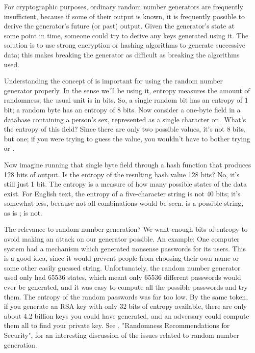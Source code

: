 \documentclass{howto}
\begin{document}
For cryptographic purposes, ordinary random number generators are
frequently insufficient, because if some of their output is known, it
is frequently possible to derive the generator's future (or past)
output.  Given the generator's state at some point in time, someone
could try to derive any keys generated using it.  The solution is to
use strong encryption or hashing algorithms to generate successive
data; this makes breaking the generator as difficult as breaking the
algorithms used.

Understanding the concept of  is important for using the
random number generator properly.  In the sense we'll be using it,
entropy measures the amount of randomness; the usual unit is in bits.
So, a single random bit has an entropy of 1 bit; a random byte has an
entropy of 8 bits.  Now consider a one-byte field in a database containing a
person's sex, represented as a single character  or .
What's the entropy of this field?  Since there are only two possible
values, it's not 8 bits, but one; if you were trying to guess the value,
you wouldn't have to bother trying  or .  

Now imagine running that single byte field through a hash function that
produces 128 bits of output.  Is the entropy of the resulting hash value
128 bits?  No, it's still just 1 bit.  The entropy is a measure of how many
possible states of the data exist.  For English
text, the entropy of a five-character string is not 40 bits; it's
somewhat less, because not all combinations would be seen.  
is a possible string, as is ;  is not.

The relevance to random number generation?  We want enough bits of
entropy to avoid making an attack on our generator possible.  An
example: One computer system had a mechanism which generated nonsense
passwords for its users.  This is a good idea, since it would prevent
people from choosing their own name or some other easily guessed string.
Unfortunately, the random number generator used only had 65536 states,
which meant only 65536 different passwords would ever be generated, and
it was easy to compute all the possible passwords and try them.  The
entropy of the random passwords was far too low.  By the same token, if
you generate an RSA key with only 32 bits of entropy available, there
are only about 4.2 billion keys you could have generated, and an
adversary could compute them all to find your private key.  See ,
"Randomness Recommendations for Security", for an interesting discussion
of the issues related to random number generation.
\end{document}
